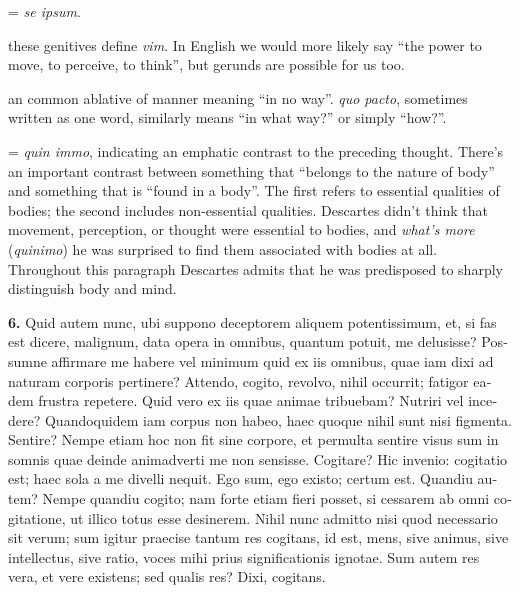  = \textit{se ipsum}.

 these genitives define \textit{vim}. In English we would more likely say ``the power to move, to perceive, to think'', but gerunds are possible for us too.

 an common ablative of manner meaning ``in no way''. \textit{quo pacto}, sometimes written as one word, similarly means ``in what way?'' or simply ``how?''.

 = \textit{quin immo}, indicating an emphatic contrast to the preceding thought. There's an important contrast between something that ``belongs to the nature of body'' and something that is ``found in a body''. The first refers to essential qualities of bodies; the second includes non-essential qualities. Descartes didn't think that movement, perception, or thought were essential to bodies, and \textit{what's more} (\textit{quinimo}) he was surprised to find them associated with bodies at all. Throughout this paragraph Descartes admits that he was predisposed to sharply distinguish body and mind.

\clearpage

\beginnumbering
\pstart
\begin{latin}
    \textenglish{\textbf{6.}} Quid autem nunc, ubi suppono deceptorem aliquem potentissimum, et, si fas est dicere, malignum, data opera in omnibus, quantum potuit, me delusisse? Possumne affirmare me habere vel minimum quid ex iis omnibus, quae iam dixi ad naturam corporis pertinere? Attendo, cogito, revolvo, nihil occurrit; fatigor eadem frustra repetere. Quid vero ex iis quae animae tribuebam? Nutriri vel incedere? Quandoquidem iam corpus non habeo, haec quoque nihil sunt nisi figmenta. Sentire? Nempe etiam hoc non fit sine corpore, et permulta sentire visus sum in somnis quae deinde animadverti me non sensisse. Cogitare? Hic invenio: cogitatio est; haec sola a me divelli nequit. Ego sum, ego existo; certum est. Quandiu autem? Nempe quandiu cogito; nam forte etiam fieri posset, si cessarem ab omni cogitatione, ut illico totus esse desinerem. Nihil nunc admitto nisi quod necessario sit verum; sum igitur praecise tantum res cogitans, id est, mens, sive animus, sive intellectus, sive ratio, voces mihi prius significationis ignotae. Sum autem res vera, et vere existens; sed qualis res? Dixi, cogitans.
\end{latin}
\pend
\endnumbering

